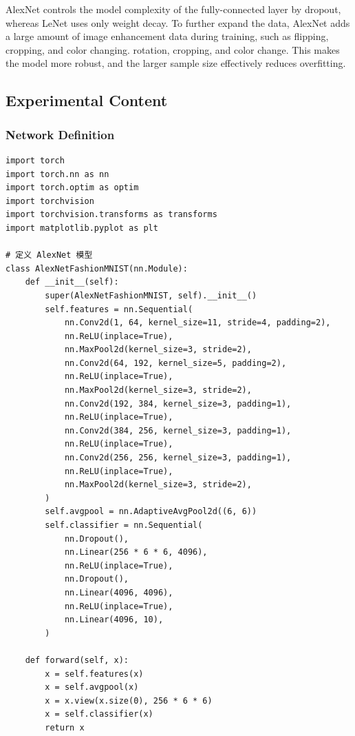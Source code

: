 \documentclass[a4paper,12pt]{article}
\begin{document}
AlexNet controls the model complexity of the fully-connected layer by dropout, whereas LeNet uses only weight
decay. To further expand the data, AlexNet adds a large amount of image enhancement data during training, such as flipping, cropping, and color changing.
rotation, cropping, and color change. This makes the model more robust, and the larger sample size effectively reduces overfitting.

\subsection{Experimental Content}
\subsubsection{Network Definition}

\begin{lstlisting}
import torch
import torch.nn as nn
import torch.optim as optim
import torchvision
import torchvision.transforms as transforms
import matplotlib.pyplot as plt

# 定义 AlexNet 模型
class AlexNetFashionMNIST(nn.Module):
    def __init__(self):
        super(AlexNetFashionMNIST, self).__init__()
        self.features = nn.Sequential(
            nn.Conv2d(1, 64, kernel_size=11, stride=4, padding=2),
            nn.ReLU(inplace=True),
            nn.MaxPool2d(kernel_size=3, stride=2),
            nn.Conv2d(64, 192, kernel_size=5, padding=2),
            nn.ReLU(inplace=True),
            nn.MaxPool2d(kernel_size=3, stride=2),
            nn.Conv2d(192, 384, kernel_size=3, padding=1),
            nn.ReLU(inplace=True),
            nn.Conv2d(384, 256, kernel_size=3, padding=1),
            nn.ReLU(inplace=True),
            nn.Conv2d(256, 256, kernel_size=3, padding=1),
            nn.ReLU(inplace=True),
            nn.MaxPool2d(kernel_size=3, stride=2),
        )
        self.avgpool = nn.AdaptiveAvgPool2d((6, 6))
        self.classifier = nn.Sequential(
            nn.Dropout(),
            nn.Linear(256 * 6 * 6, 4096),
            nn.ReLU(inplace=True),
            nn.Dropout(),
            nn.Linear(4096, 4096),
            nn.ReLU(inplace=True),
            nn.Linear(4096, 10),
        )

    def forward(self, x):
        x = self.features(x)
        x = self.avgpool(x)
        x = x.view(x.size(0), 256 * 6 * 6)
        x = self.classifier(x)
        return x

\end{lstlisting}
\end{document}
